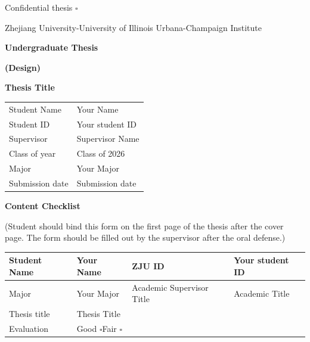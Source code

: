 \documentclass[12pt,a4paper]{report}
\newcommand{\ThesisTitle}{Thesis Title}
\newcommand{\StudentName}{Your Name}
\newcommand{\StudentID}{Your student ID}
\newcommand{\SupervisorName}{Supervisor Name}
\newcommand{\SupervisorTitle}{Academic Title}
\newcommand{\ClassYear}{Class of 2026}
\newcommand{\Major}{Your Major}
\newcommand{\SubmissionDate}{Submission date}
\newcommand{\ConfidentialMark}{}
\newcommand{\fronttitle}[1]{%
  \clearpage
  \begin{center}
    {\bfseries\fontsize{24}{28}\selectfont #1}
  \end{center}
  \vspace{1em}
}
\begin{document}
\begin{titlepage}
\thispagestyle{empty}
\begin{flushright}
\ConfidentialMark{}Confidential thesis $\square$
\end{flushright}
\vspace*{1.2cm}
\begin{center}
{\fontsize{18}{22}\selectfont Zhejiang University-University of Illinois Urbana-Champaign Institute\par}
\vspace{1.4cm}
{\bfseries\fontsize{24}{30}\selectfont Undergraduate Thesis\par}
\vspace{0.3cm}
{\bfseries\fontsize{20}{24}\selectfont (Design)\par}
\vspace{2.2cm}
{\bfseries\fontsize{20}{24}\selectfont \ThesisTitle\par}
\vfill
\renewcommand{\arraystretch}{1.6}
\begin{tabular}{>{\raggedleft\arraybackslash}p{} p{}}
Student Name & \StudentName\\
Student ID & \StudentID\\
Supervisor & \SupervisorName\\
Class of year & \ClassYear\\
Major & \Major\\
Submission date & \SubmissionDate\\
\end{tabular}
\end{center}
\end{titlepage}

\setcounter{page}{2}

\fronttitle{Content Checklist}

\begin{center}
\small
(Student should bind this form on the first page of the thesis after the cover page. The form should be filled out by the supervisor after the oral defense.)
\end{center}
\vspace{0.5em}

\renewcommand{\arraystretch}{1.35}
\begin{tabularx}{\textwidth}{|p{}|X|p{}|X|}
\hline
Student Name & \StudentName & ZJU ID & \StudentID\\ \hline
Major & \Major & Academic Supervisor Title & \SupervisorTitle\\ \hline
Thesis title & \multicolumn{3}{p{0.69\textwidth}|}{\ThesisTitle}\\ \hline
Evaluation & \multicolumn{3}{p{0.69\textwidth}|}{Good $\square$\quad Fair $\square$}\\ \hline
\end{tabularx}
\end{document}
